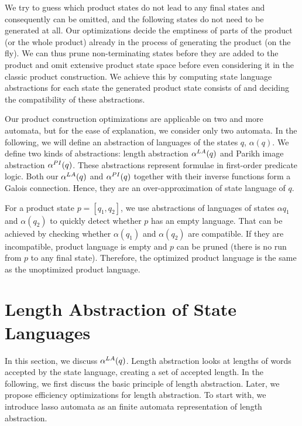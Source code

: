 We try to guess which product states do not lead to any final states and consequently can be omitted, and the following states do not need to be generated at all. Our optimizations decide the emptiness of parts of the product (or the whole product) already in the process of generating the product (on the fly). We can thus prune non-terminating states before they are added to the product and omit extensive product state space before even considering it in the classic product construction. We achieve this by computing state language abstractions for each state the generated product state consists of and deciding the compatibility of these abstractions.

Our product construction optimizations are applicable on two and more automata, but for the ease of explanation, we consider only two automata. In the following, we will define an abstraction of languages of the states $q$, $\alpha(q)$. We define two kinds of abstractions: length abstraction $\alpha^{LA}(q)$ and Parikh image abstraction $\alpha^{PI}(q)$. These abstractions represent formulae in first-order predicate logic. Both our $\alpha^{LA}(q)$ and $\alpha^{PI}(q)$ together with their inverse functions form a Galois connection. Hence, they are an over-approximation of state language of $q$.

For a product state $p = [q_1, q_2]$, we use abstractions of languages of states $\alpha{q_1}$ and $\alpha(q_2)$ to quickly detect whether $p$ has an empty language. That can be achieved by checking whether $\alpha(q_1)$ and $\alpha(q_2)$ are compatible. If they are incompatible, product language is empty and $p$ can be pruned (there is no run from $p$ to any final state). Therefore, the optimized product language is the same as the unoptimized product language.


\section{Length Abstraction of State Languages}

In this section, we discuss $\alpha^{LA}(q)$. Length abstraction looks at lengths of words accepted by the state language, creating a set of accepted length. In the following, we first discuss the basic principle of length abstraction. Later, we propose efficiency optimizations for length abstraction. To start with, we introduce lasso automata as an finite automata representation of length abstraction.


